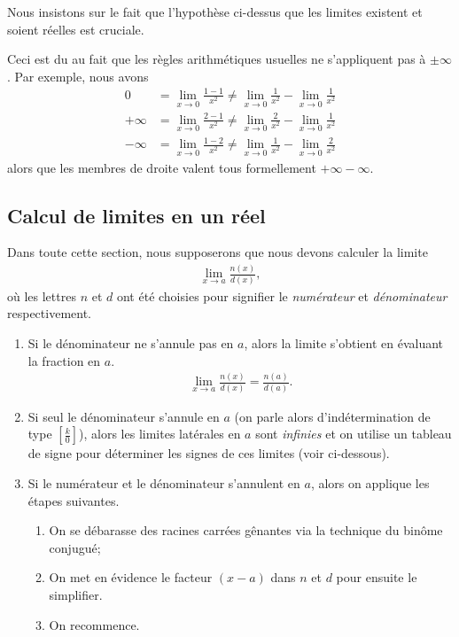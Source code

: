 \documentclass[main.tex]{subfiles}
\begin{document}
\begin{remark}
    Nous insistons sur le fait que l'hypothèse ci-dessus
    que les limites existent et soient réelles
    est cruciale.

    Ceci est du au fait
    que les règles arithmétiques usuelles ne s'appliquent pas à $\pm \infty$.
    Par exemple,
    nous avons
    \begin{align}
        0 &= \lim_{x \to 0} \frac {1 - 1} {x^2} \neq \lim_{x \to 0} \frac 1 {x^2} - \lim_{x \to 0} \frac 1 {x^2}\\
        +\infty &= \lim_{x \to 0} \frac {2 - 1} {x^2} \neq \lim_{x \to 0} \frac 2 {x^2} - \lim_{x \to 0} \frac 1 {x^2}\\
        -\infty &= \lim_{x \to 0} \frac {1 - 2} {x^2} \neq \lim_{x \to 0} \frac 1 {x^2} - \lim_{x \to 0} \frac 2 {x^2}
    \end{align}
    alors que les membres de droite valent tous formellement $+\infty - \infty$.
\end{remark}

\subsection{Calcul de limites en un réel}

Dans toute cette section,
nous supposerons que nous devons calculer la limite
\begin{align}
    \lim_{x \to a} \frac {n(x)} {d(x)},
\end{align}
où les lettres $n$ et $d$ ont été choisies
pour signifier le \emph{numérateur} et \emph{dénominateur} respectivement.

\begin{enumerate}
    \item Si le dénominateur ne s'annule pas en $a$,
        alors la limite s'obtient en évaluant la fraction en $a$.
        \begin{align}
            \lim_{x \to a} \frac {n(x)} {d(x)} = \frac {n(a)} {d(a)}.
        \end{align}
    \item Si seul le dénominateur s'annule en $a$
        (on parle alors d'indétermination de type $\left[\frac k 0\right]$),
        alors les limites latérales en $a$ sont \emph{infinies}
        et on utilise un tableau de signe pour déterminer les signes de ces limites
        (voir ci-dessous).
    \item Si le numérateur et le dénominateur s'annulent en $a$,
        alors on applique les étapes suivantes.
        \begin{enumerate}
            \item On se débarasse des racines carrées gênantes via la technique du binôme conjugué;
            \item On met en évidence le facteur $(x - a)$ dans $n$ et $d$ pour ensuite le simplifier.
            \item On recommence.
        \end{enumerate}
\end{enumerate}
\end{document}
